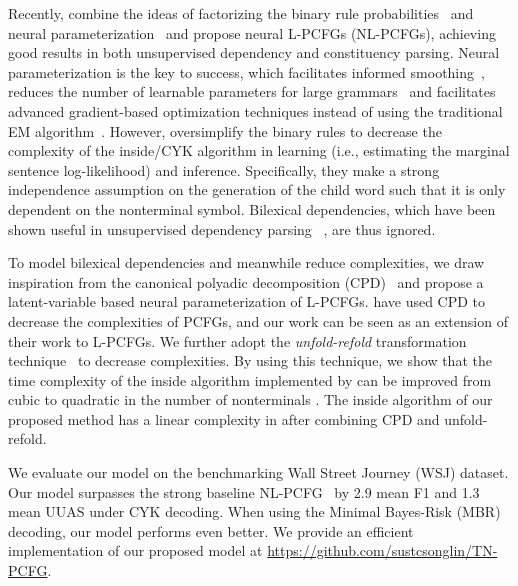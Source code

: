 \documentclass[11pt,a4paper]{article}
\begin{document}
Recently, \citet{zhu-etal-2020-return} combine the ideas of factorizing the binary rule probabilities~\citep{collins-2003-head} and neural parameterization~\citep{kim-etal-2019-compound} and propose neural L-PCFGs (NL-PCFGs), achieving good results in both unsupervised dependency and constituency parsing.  Neural parameterization is the key to success, which facilitates informed smoothing~\cite{kim-etal-2019-compound}, reduces the number of learnable parameters for large grammars~\cite{chiu-rush-2020-scaling, yang-etal-2021-pcfgs} and facilitates advanced gradient-based optimization techniques instead of using the traditional EM algorithm~\cite{eisner-2016-inside}. However, \citet{zhu-etal-2020-return} oversimplify the binary rules to decrease the complexity of the inside/CYK algorithm in learning (i.e., estimating the marginal sentence log-likelihood) and inference. Specifically, they make a strong independence assumption on the generation of the child word such that 
it is only dependent on the nonterminal symbol. Bilexical dependencies, which have been shown useful in unsupervised dependency parsing ~\cite{han-etal-2017-dependency, yang-etal-2020-second}, are thus ignored.



To model bilexical dependencies and meanwhile reduce complexities, we draw inspiration from the canonical polyadic decomposition (CPD)~\cite{CPD} and propose a latent-variable based neural parameterization of L-PCFGs. \citet{cohen-etal-2013-approximate,  yang-etal-2021-pcfgs} have used CPD to decrease the complexities of PCFGs, and our work can be seen as an extension of their work to L-PCFGs. 
We further adopt the \emph{unfold-refold} transformation technique~\cite{ eisner-blatz-2007} to decrease complexities. By using this technique, we show that the time complexity of the inside algorithm implemented by \citet{zhu-etal-2020-return} can be improved from cubic to quadratic in the number of nonterminals . The inside algorithm of our proposed method has a linear complexity in  after combining CPD and unfold-refold.




We evaluate our model on the benchmarking Wall Street Journey (WSJ) dataset. Our model surpasses the strong baseline NL-PCFG~\cite{zhu-etal-2020-return} by 2.9 mean F1 and 1.3 mean UUAS under CYK decoding. When using the Minimal Bayes-Risk (MBR) decoding, our model performs even better. We provide an efficient implementation of our proposed model at \url{https://github.com/sustcsonglin/TN-PCFG}.
\end{document}
